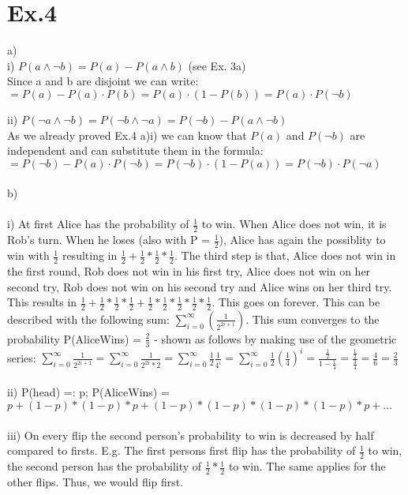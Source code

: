 \documentclass[11pt]{article}
\begin{document}
\section*{Ex.4}

a)\\
i) $P(a \wedge \neg b) = P(a) - P(a \wedge b) $ (see Ex. 3a) \\
Since a and b are disjoint we can write: \\
$ = P(a) - P(a) \cdot P(b) = P(a) \cdot (1 - P(b)) = P(a) \cdot P(\neg b)$ \newline 
\newline

ii) $P(\neg a \wedge \neg b) = P(\neg b \wedge \neg a) = P(\neg b) - P(a \wedge \neg b)$ \\
As we already proved Ex.4 a)i) we can know that $P(a)$ and $P(\neg b)$ are independent and can substitute them in the formula: \\
$= P(\neg b) - P(a) \cdot P(\neg b) = P(\neg b) \cdot (1 - P(a)) = P(\neg b) \cdot P(\neg a)$
\\ \\
\noindent
b)\\
\\
i) At first Alice has the probability of $\frac{1}{2}$ to win. When Alice does not win, it is Rob's turn. When he loses (also with P = $\frac{1}{2}$), Alice has again the possiblity to win with $\frac{1}{2}$ resulting in $\frac{1}{2}+\frac{1}{2}*\frac{1}{2}*\frac{1}{2}$. The third step is that, Alice does not win in the first round, Rob does not win in his first try, Alice does not win on her second try, Rob does not win on his second try and Alice wins on her third try. This results in $\frac{1}{2}+\frac{1}{2}*\frac{1}{2}*\frac{1}{2}+\frac{1}{2}*\frac{1}{2}*\frac{1}{2}*\frac{1}{2}*\frac{1}{2}$. This goes on forever. This can be described with the following sum: $ \sum\nolimits_{i=0}^\infty(\frac{1}{2^{2i+1}})$. This sum converges to the probability P(AliceWins) = $\frac{2}{3}$ - shown as follows by making use of the geometric series: $ \sum\nolimits_{i=0}^\infty\frac{1}{2^{2i+1}} = \sum\nolimits_{i=0}^\infty\frac{1}{2^{2i}*2} = \sum\nolimits_{i=0}^\infty\frac{1}{2}\frac{1}{4^{i}} = \sum\nolimits_{i=0}^\infty\frac{1}{2}(\frac{1}{4})^{i} = \frac{\frac{1}{2}}{1-\frac{1}{4}} = \frac{\frac{1}{2}}{\frac{3}{4}} = \frac{4}{6} = \frac{2}{3}$\\
\\
ii) P(head) =: p; P(AliceWins) = $p + (1-p) *(1-p) * p + (1-p) * (1-p) * (1-p) * (1-p) *p + \dots$ \\
\\
iii) On every flip the second person's probability to win is decreased by half compared to firsts. E.g. The first persons first flip has the probability of $\frac{1}{2}$ to win, the second person has the probability of $\frac{1}{2}*\frac{1}{2}$ to win. The same applies for the other flips. Thus, we would flip first.\\
\\
\end{document}
